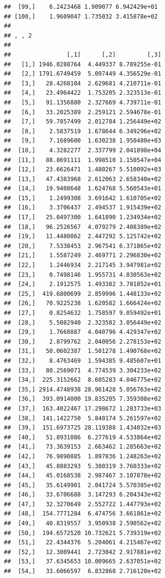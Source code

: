 \documentclass[article]{jss}\usepackage[]{graphicx}\usepackage[]{xcolor}
\makeatletter
\newenvironment{kframe}{%
 \def\at@end@of@kframe{}%
 \ifinner\ifhmode%
  \def\at@end@of@kframe{\end{minipage}}%
  \begin{minipage}{\columnwidth}%
 \fi\fi%
 \def\FrameCommand##1{\hskip\@totalleftmargin \hskip-\fboxsep
 \colorbox{shadecolor}{##1}\hskip-\fboxsep
     \hskip-\linewidth \hskip-\@totalleftmargin \hskip\columnwidth}%
 \MakeFramed {\advance\hsize-\width
   \@totalleftmargin\z@ \linewidth\hsize
   \@setminipage}}%
 {\par\unskip\endMakeFramed%
 \at@end@of@kframe}
\newenvironment{knitrout}{}{} %
\makeatother
\begin{document}
\begin{knitrout}
\begin{kframe}
\begin{verbatim}
##  [99,]    6.2423468 1.909077 6.942429e+01
## [100,]    1.9609047 1.735032 3.415878e+02
## 
## , , 2
## 
##                [,1]      [,2]         [,3]
##   [1,] 1946.0288764  4.449337 8.789255e-01
##   [2,] 1791.6749459  5.097449 4.356529e-01
##   [3,]   28.4268184  2.629681 4.210711e-01
##   [4,]   23.4964422  1.753205 2.323513e-01
##   [5,]   91.1356880  2.327669 4.739711e-01
##   [6,]   33.2025389  2.259121 2.594678e-01
##   [7,]   59.7857499  2.012784 1.256449e+02
##   [8,]    2.5837519  1.678644 6.349296e+02
##   [9,]    7.1689600  1.630238 1.950480e+03
##  [10,]    4.3282277  2.337799 2.041898e+04
##  [11,]   88.8691111  1.998510 1.150547e+04
##  [12,]   23.6626471  1.480267 5.510092e+03
##  [13,]   47.4383968  2.612063 2.658340e+02
##  [14,]   19.9408648  1.624768 5.560543e+01
##  [15,]    1.2499308  3.691642 1.610705e+02
##  [16,]    3.3706437  2.494537 1.915439e+02
##  [17,]   25.0497300  1.641890 1.234934e+02
##  [18,]   96.2526567  4.079279 2.408389e+02
##  [19,]   11.4480862  2.447292 5.125742e+02
##  [20,]    7.5338453  2.967541 6.371865e+02
##  [21,]    1.5587249  2.469771 2.296830e+02
##  [22,]    1.2446934  2.217145 3.947981e+02
##  [23,]    0.7498146  1.955731 4.030563e+02
##  [24,]    2.1912575  1.493382 3.781852e+01
##  [25,]  419.6800699  2.859996 1.448133e+02
##  [26,]   70.9225238  1.620582 1.666424e+02
##  [27,]    0.8254632  1.758597 9.059492e+01
##  [28,]    5.5082940  2.323502 3.056449e+02
##  [29,]    1.7668887  4.040796 4.429347e+02
##  [30,]    2.8799762  2.040056 2.278153e+02
##  [31,]   50.0602387  1.501278 1.490768e+02
##  [32,]    8.4763469  1.594385 9.485607e+01
##  [33,]   80.2569071  4.774539 3.304233e+02
##  [34,]  225.3152662  8.605283 4.046775e+02
##  [35,] 2914.4748938 28.961428 5.056763e+02
##  [36,]  393.0914000 19.835205 7.359308e+02
##  [37,]  163.4022467 17.298672 1.283733e+03
##  [38,]  141.1422750  5.840174 5.261597e+02
##  [39,]  151.6973725 28.119388 1.434032e+03
##  [40,]   51.8931086  6.277619 4.533864e+02
##  [41,]   73.3639153  2.663462 1.285663e+02
##  [42,]   76.9890885  1.897836 1.248263e+02
##  [43,]   45.8883293  5.380319 3.760333e+02
##  [44,]   45.0168538  2.987467 3.107878e+02
##  [45,]   35.6149901  2.041724 5.570385e+02
##  [46,]   33.6706688  3.147293 6.204343e+02
##  [47,]   32.3270649  2.552722 1.447793e+02
##  [48,]  154.7771284  6.474756 3.661861e+02
##  [49,]   40.8319557  3.950938 2.590562e+02
##  [50,]  194.6572520 10.732621 5.739319e+02
##  [51,]   22.4344376  5.204061 4.215467e+02
##  [52,]   12.3809441  2.723042 2.917881e+02
##  [53,]   37.6345653 10.009665 2.637051e+02
##  [54,]   33.6066597  6.832868 2.716120e+02

\end{verbatim}
\end{kframe}
\end{knitrout}
\end{document}
